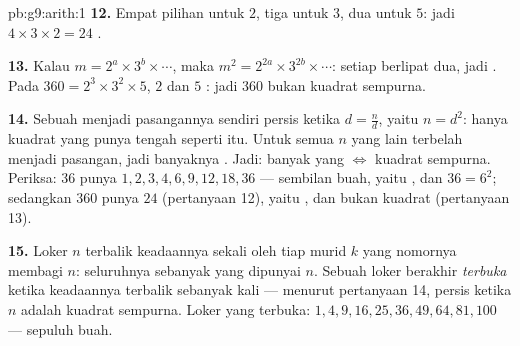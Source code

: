 \begin{solution}{pb:g9:arith:1}
\textbf{12.} Empat pilihan  untuk $2$, tiga untuk $3$,
dua untuk $5$: jadi $4 \times 3 \times 2 = 24$ .

\textbf{13.} Kalau $m = 2^{a} \times 3^{b} \times \cdots$, maka
$m^2 = 2^{2a} \times 3^{2b} \times \cdots$: setiap 
berlipat dua, jadi . Pada $360 = 2^3 \times 3^2 \times 5$,
 $2$ dan  $5$ : jadi $360$ bukan kuadrat
sempurna.

\textbf{14.} Sebuah  menjadi pasangannya sendiri persis ketika
$d = \frac nd$, yaitu $n = d^2$: hanya kuadrat yang punya 
tengah seperti itu. Untuk semua $n$ yang lain  terbelah
menjadi pasangan, jadi banyaknya . Jadi: banyak  yang
 $\Leftrightarrow$ kuadrat sempurna. Periksa: $36$ punya 
$1, 2, 3, 4, 6, 9, 12, 18, 36$ --- sembilan buah, yaitu , dan
$36 = 6^2$; sedangkan $360$ punya $24$ (pertanyaan 12), yaitu ,
dan bukan kuadrat (pertanyaan 13).

\textbf{15.} Loker $n$ terbalik keadaannya sekali oleh tiap murid $k$
yang nomornya membagi $n$: seluruhnya sebanyak  yang dipunyai
$n$. Sebuah loker berakhir \emph{terbuka} ketika keadaannya terbalik
sebanyak  kali --- menurut pertanyaan 14, persis ketika
$n$ adalah kuadrat sempurna. Loker yang terbuka:
$1, 4, 9, 16, 25, 36, 49, 64, 81, 100$ --- sepuluh buah.

\end{solution}
